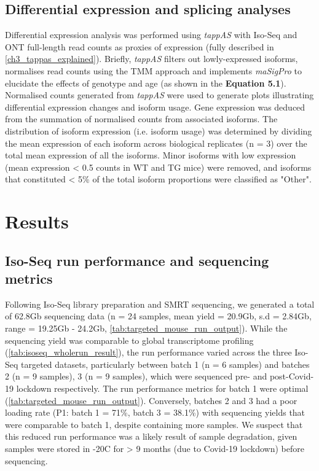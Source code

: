 \newpage
\subsection{Differential expression and splicing analyses}
Differential expression analysis was performed using \textit{tappAS} with Iso-Seq and ONT full-length read counts as proxies of expression  (fully described in \cref{ch3_tappas_explained}). Briefly, \textit{tappAS} filters out lowly-expressed isoforms, normalises read counts using the TMM approach and implements \textit{maSigPro}\cite{Conesa2006,Nueda2014,Conesa2017} to elucidate the effects of genotype and age (as shown in the \textbf{Equation 5.1}). Normalised counts generated from \textit{tappAS} were used to generate plots illustrating differential expression changes and isoform usage. Gene expression was deduced from the summation of normalised counts from associated isoforms. The distribution of isoform expression (i.e. isoform usage) was determined by dividing the mean expression of each isoform across biological replicates (n = 3) over the total mean expression of all the isoforms. Minor isoforms with low expression (mean expression < 0.5 counts in WT and TG mice) were removed, and isoforms that constituted < 5\% of the total isoform proportions were classified as "Other". 

\newpage
\section{Results}
\subsection{Iso-Seq run performance and sequencing metrics}
Following Iso-Seq library preparation and SMRT sequencing, we generated a total of 62.8Gb sequencing data (n = 24 samples, mean yield = 20.9Gb, s.d = 2.84Gb, range = 19.25Gb - 24.2Gb, \cref{tab:targeted_mouse_run_output}). While the sequencing yield was comparable to global transcriptome profiling (\cref{tab:isoseq_wholerun_result}), the run performance varied across the three Iso-Seq targeted datasets, particularly between batch 1 (n = 6 samples) and batches 2 (n = 9 samples), 3 (n = 9 samples), which were sequenced pre- and post-Covid-19 lockdown respectively. The run performance metrics for batch 1 were optimal (\cref{tab:targeted_mouse_run_output}). Conversely, batches 2 and 3 had a poor loading rate (P1: batch 1 =  71\%, batch 3 = 38.1\%) with sequencing yields that were comparable to batch 1, despite containing more samples. We suspect that this reduced run performance was a likely result of sample degradation, given samples were stored in -20\textdegree C for > 9 months (due to Covid-19 lockdown) before sequencing. 

